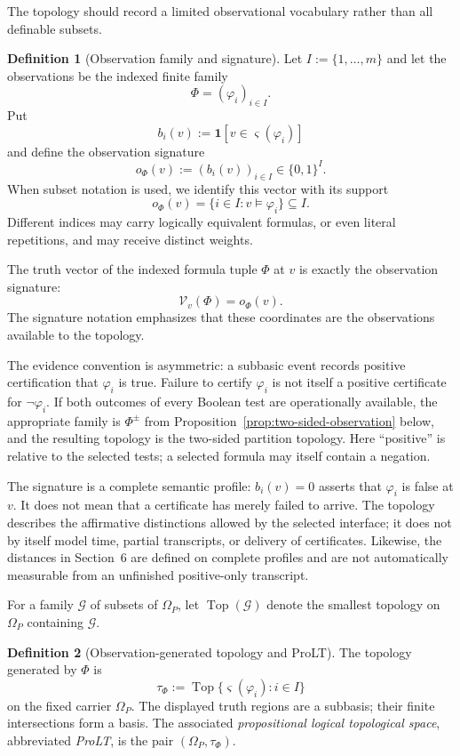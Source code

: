 \documentclass[11pt]{article}
\theoremstyle{definition}
\newtheorem{definition}{Definition}[section]
\theoremstyle{plain}
\theoremstyle{remark}
\newcommand{\Top}{\operatorname{Top}}
\newcommand{\ind}{\mathbf 1}
\newcommand{\modelsF}{\models}
\begin{document}
The topology should record a limited observational vocabulary rather than all
definable subsets.

\begin{definition}[Observation family and signature]
Let $I:=\{1,\ldots,m\}$ and let the observations be the indexed finite family
\[
  \Phi=(\varphi_i)_{i\in I}.
\]
Put
\[
  b_i(v):=\ind[v\in\varsigma(\varphi_i)]
\]
and define the observation signature
\[
  o_\Phi(v):=(b_i(v))_{i\in I}\in\{0,1\}^I.
\]
When subset notation is used, we identify this vector with its support
\[
  o_\Phi(v)=\{i\in I:v\modelsF\varphi_i\}\subseteq I.
\]
Different indices may carry logically equivalent formulas, or even literal
repetitions, and may receive distinct weights.
\end{definition}

The truth vector of the indexed formula tuple $\Phi$ at $v$ is
exactly the observation signature:
\[
 \mathcal V_v(\Phi)=o_\Phi(v).
\]
The signature notation emphasizes that these coordinates are the observations
available to the topology.

The evidence convention is asymmetric: a subbasic event records positive
certification that $\varphi_i$ is true.  Failure to certify $\varphi_i$ is not
itself a positive certificate for $\neg\varphi_i$.  If both outcomes of every
Boolean test are operationally available, the appropriate family is
$\Phi^{\pm}$ from Proposition~\ref{prop:two-sided-observation} below, and the
resulting topology is the two-sided partition topology.  Here ``positive'' is
relative to the selected tests; a selected formula may itself contain a
negation.

The signature is a complete semantic profile: $b_i(v)=0$ asserts that
$\varphi_i$ is false at $v$.  It does not mean that a certificate has merely
failed to arrive.  The topology describes the affirmative distinctions allowed
by the selected interface; it does not by itself model time, partial transcripts,
or delivery of certificates.  Likewise, the distances in Section~6 are defined
on complete profiles and are not automatically measurable from an unfinished
positive-only transcript.

For a family $\mathcal G$ of subsets of $\Omega_P$, let
$\Top(\mathcal G)$ denote the smallest topology on $\Omega_P$ containing
$\mathcal G$.

\begin{definition}[Observation-generated topology and ProLT]
The topology generated by $\Phi$ is
\[
  \tau_\Phi:=\Top\{\varsigma(\varphi_i):i\in I\}
\]
on the fixed carrier $\Omega_P$.  The displayed truth regions are a subbasis;
their finite intersections form a basis.  The associated \emph{propositional
logical topological space}, abbreviated \emph{ProLT}, is the pair
$(\Omega_P,\tau_\Phi)$.
\end{definition}
\end{document}
